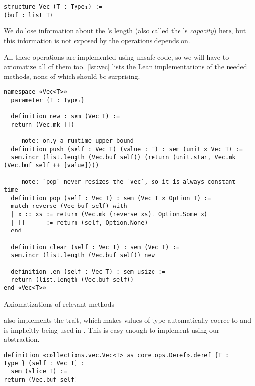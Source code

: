 \begin{verbatim}
structure Vec (T : Type₁) :=
(buf : list T)
\end{verbatim}

We do lose information about the 's length (also called the
's \emph{capacity}) here, but this information is not exposed by the
 operations  depends on.

All these operations are implemented using unsafe code, so we will have to
axiomatize all of them too. \autoref{lst:vec} lists the Lean implementations of
the needed  methods, none of which should be surprising.

\begin{listing}[bt!]
\begin{verbatim}
namespace «Vec<T>»
  parameter {T : Type₁}

  definition new : sem (Vec T) :=
  return (Vec.mk [])

  -- note: only a runtime upper bound
  definition push (self : Vec T) (value : T) : sem (unit × Vec T) :=
  sem.incr (list.length (Vec.buf self)) (return (unit.star, Vec.mk (Vec.buf self ++ [value])))

  -- note: `pop` never resizes the `Vec`, so it is always constant-time
  definition pop (self : Vec T) : sem (Vec T × Option T) :=
  match reverse (Vec.buf self) with
  | x :: xs := return (Vec.mk (reverse xs), Option.Some x)
  | []      := return (self, Option.None)
  end

  definition clear (self : Vec T) : sem (Vec T) :=
  sem.incr (list.length (Vec.buf self)) new

  definition len (self : Vec T) : sem usize :=
  return (list.length (Vec.buf self))
end «Vec<T>»
\end{verbatim}
  
  \caption{Axiomatizations of relevant  methods}
  \label{lst:vec}
\end{listing}

 also implements the  trait, which makes values of type
 automatically coerce to \rust{&[T]} and is implicitly being used
in . This is easy enough to implement using our abstraction.

\begin{verbatim}
definition «collections.vec.Vec<T> as core.ops.Deref».deref {T : Type₁} (self : Vec T) :
  sem (slice T) :=
return (Vec.buf self)
\end{verbatim}

